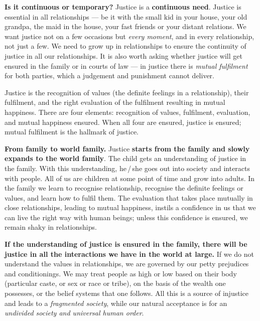 \textbf{Is it continuous or temporary?} Justice is a \textbf{continuous need}.
Justice is essential in all relationships --- be it with the small kid in your
house, your old grandpa, the maid in the house, your fast friends or your
distant relations. We want justice not on a few occasions but \emph{every
moment}, and in every relationship, not just a few. We need to grow up in
relationships to ensure the continuity of justice in all our relationships. It
is also worth asking whether justice will get ensured in the family or in
courts of law --- in justice there is \emph{mutual fulfilment} for both
parties, which a judgement and punishment cannot deliver.


\ans Justice is the recognition of values (the definite feelings in a
relationship), their fulfilment, and the right evaluation of the fulfilment
resulting in mutual happiness. There are four elements: recognition of values,
fulfilment, evaluation, and mutual happiness ensured. When all four are
ensured, justice is ensured; mutual fulfilment is the hallmark of justice.

\textbf{From family to world family.} Justice \textbf{starts from the family
and slowly expands to the world family}. The child gets an understanding of
justice in the family. With this understanding, he\,/\,she goes out into
society and interacts with people. All of us are children at some point of
time and grow into adults. In the family we learn to recognise relationship,
recognise the definite feelings or values, and learn how to fulfil them. The
evaluation that takes place mutually in close relationships, leading to mutual
happiness, instils a confidence in us that we can live the right way with
human beings; unless this confidence is ensured, we remain shaky in
relationships.

\textbf{If the understanding of justice is ensured in the family, there will
be justice in all the interactions we have in the world at large.} If we do
not understand the values in relationships, we are governed by our petty
prejudices and conditionings. We may treat people as high or low based on
their body (particular caste, or sex or race or tribe), on the basis of the
wealth one possesses, or the belief systems that one follows. All this is a
source of injustice and leads to a \emph{fragmented society}, while our
natural acceptance is for an \emph{undivided society and universal human
order}.

